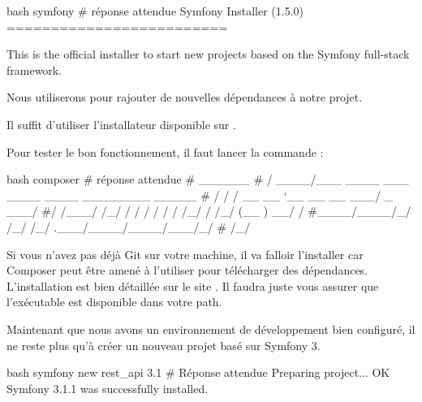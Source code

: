 \documentclass[big]{zmdocument}
\begin{document}
\begin{CodeBlock}{bash}
symfony
# réponse attendue
 Symfony Installer (1.5.0)
 =========================

 This is the official installer to start new projects based on the
 Symfony full-stack framework.
\end{CodeBlock}





Nous utiliserons  pour rajouter de nouvelles dépendances à notre projet.



Il suffit d'utiliser l'installateur disponible sur .



Pour tester le bon fonctionnement, il faut lancer la commande :



\begin{CodeBlock}{bash}
composer
# réponse attendue
#   ______
#  / ____/___  ____ ___  ____  ____  ________  _____
# / /   / __ \/ __ `__ \/ __ \/ __ \/ ___/ _ \/ ___/
#/ /___/ /_/ / / / / / / /_/ / /_/ (__  )  __/ /
#\____/\____/_/ /_/ /_/ .___/\____/____/\___/_/
#                    /_/             
\end{CodeBlock}





Si vous  n'avez pas déjà Git sur votre machine, il va falloir l'installer car Composer peut être amené à l'utiliser pour télécharger des dépendances. L'installation est bien détaillée sur le site .
Il faudra juste vous assurer que l’exécutable  est disponible dans votre path.









Maintenant que nous avons un environnement de développement bien configuré, il ne reste plus qu'à créer un nouveau projet basé sur Symfony 3.



\begin{CodeBlock}{bash}
symfony new rest_api 3.1
# Réponse attendue
Preparing project...
OK  Symfony 3.1.1 was successfully installed.
\end{CodeBlock}
\end{document}
